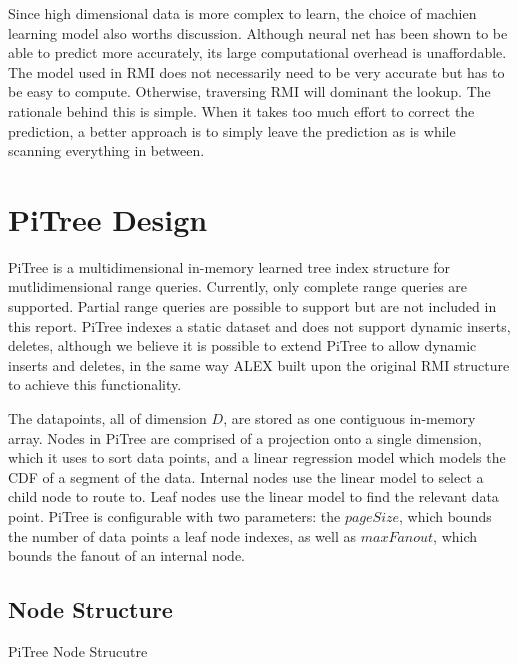 \documentclass[sigconf,10pt]{acmart}
\begin{document}
Since high dimensional data is more complex to learn, the choice of machien learning model also
worths discussion. Although neural net has been shown to be able to predict more accurately, its
large computational overhead is unaffordable. The model used in RMI does not necessarily need to
be very accurate but has to be easy to compute. Otherwise, traversing RMI will dominant the lookup.
The rationale behind this is simple. When it takes too much effort to correct the prediction, a better
approach is to simply leave the prediction as is while scanning everything in between. 

\section{PiTree Design}

PiTree is a multidimensional in-memory learned tree index structure for
mutlidimensional range queries. Currently, only complete range queries are supported.
Partial range queries are possible to support but are not included in this report. 
PiTree indexes a static dataset and does not support dynamic inserts, deletes,
although we believe it is possible to extend PiTree to allow dynamic inserts and deletes,
in the same way ALEX built upon the original RMI structure to achieve this functionality. %

The datapoints, all of dimension $D$, are stored as one contiguous in-memory array.
Nodes in PiTree are comprised of a projection onto a single dimension, which it uses to
sort data points, and a linear regression model which models the CDF of a segment of the data.
Internal nodes use the linear model to select a child node to route to.
Leaf nodes use the linear model to find the relevant data point. 
PiTree is configurable with two parameters: the $pageSize$, 
which bounds the number of data points
a leaf node indexes, as well as $maxFanout$, which bounds the fanout
of an internal node.

\subsection{Node Structure}

\begin{algorithm}[t]
  \SetAlgoNoLine\PrintSemicolon
  \caption{PiTree Node Strucutre}
  \label{PiTreeNode}
\end{algorithm}
\end{document}
